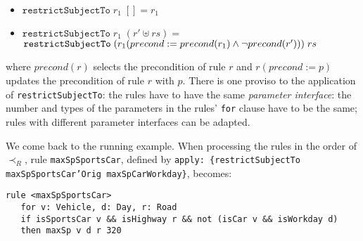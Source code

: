 \begin{itemize}
\item $\mathtt{restrictSubjectTo}\; r_1\; [] = r_1$
\item $\mathtt{restrictSubjectTo}\; r_1\; (r' \uplus rs) =$\\
  $\mathtt{restrictSubjectTo}\; (r_1(precond := precond(r_1) \land \lnot precond(r')))\; rs$
\end{itemize}
where $precond(r)$ selects the precondition of rule $r$ and $r(precond:=p)$
updates the precondition of rule $r$ with $p$.
There is one proviso to the application of \texttt{restrictSubjectTo}: the
rules have to have the same \emph{parameter interface}: the number and types
of the parameters in the rules' \texttt{for} clause have to be the same; 
rules with different parameter interfaces can be adapted.




\begin{example}
We come back to the running example. When processing the rules in the order of
$\prec_R$, rule \texttt{maxSpSportsCar}, defined by
\texttt{apply: \{restrictSubjectTo maxSpSportsCar'Orig maxSpCarWorkday\}},
becomes:
\begin{lstlisting}
rule <maxSpSportsCar>
   for v: Vehicle, d: Day, r: Road
   if isSportsCar v && isHighway r && not (isCar v && isWorkday d) 
   then maxSp v d r 320
 \end{lstlisting}



\end{example}

